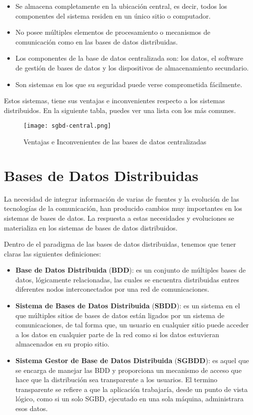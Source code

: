 \begin{itemize}
    \item Se almacena completamente en la ubicación central, es decir, todos los componentes del sistema residen en un único sitio o computador.
    \item No posee múltiples elementos de procesamiento o mecanismos de comunicación como en las bases de datos distribuidas.
    \item Los componentes de la base de datos centralizada son: los datos, el software de gestión de bases de datos y los dispositivos de almacenamiento secundario.
    \item Son sistemas en los que su seguridad puede verse comprometida fácilmente.
\end{itemize}

Estos sistemas, tiene sus ventajas e inconvenientes respecto a los sistemas distribuidos. En la siguiente tabla, puedes ver una lista con los más comunes.

\begin{figure}[ht]
    \centering
    \texttt{[image: sgbd-central.png]}
    \caption{Ventajas e Inconvenientes de las bases de datos centralizadas}
\end{figure}

\section{Bases de Datos Distribuidas}
La necesidad de integrar información de varias de fuentes y la evolución de las tecnologías de la comunicación, han producido cambios muy importantes en los sistemas de bases de datos. La respuesta a estas necesidades y evoluciones se materializa en los sistemas de bases de datos distribuidos.

Dentro de el paradigma de las bases de datos distribuidas, tenemos que tener claras las siguientes definiciones:

\begin{itemize}
    \item \textbf{Base de Datos Distribuida} (\textbf{BDD}): es un conjunto de múltiples bases de datos, lógicamente relacionadas, las cuales se encuentra distribuidas entres diferentes nodos interconectados por una red de comunicaciones.

    \item \textbf{Sistema de Bases de Datos Distribuida} (\textbf{SBDD}): es un sistema en el que múltiples sitios de bases de datos están ligados por un sistema de comunicaciones, de tal forma que, un usuario en cualquier sitio puede acceder a los datos en cualquier parte de la red como si los datos estuvieran almacenados en su propio sitio.

    \item \textbf{Sistema Gestor de Base de Datos Distribuida} (\textbf{SGBDD}): es aquel que se encarga de manejar las BDD y proporciona un mecanismo de acceso que hace que la distribución sea transparente a los usuarios. El termino transparente se refiere a que la aplicación trabajaría, desde un punto de vista lógico, como si un solo SGBD, ejecutado en una sola máquina, administrara esos datos.
\end{itemize}



